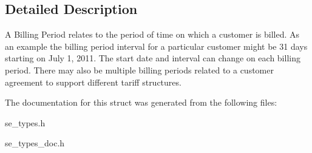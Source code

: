 \subsection{Detailed Description}
A Billing Period relates to the period of time on which a customer is billed. As an example the billing period interval for a particular customer might be 31 days starting on July 1, 2011. The start date and interval can change on each billing period. There may also be multiple billing periods related to a customer agreement to support different tariff structures. 

The documentation for this struct was generated from the following files\+:\begin{DoxyCompactItemize}
\item 
se\+\_\+types.\+h\item 
se\+\_\+types\+\_\+doc.\+h\end{DoxyCompactItemize}
